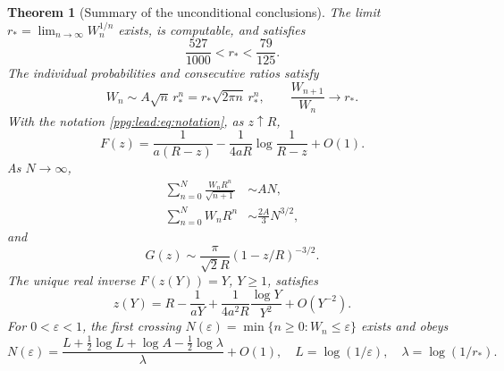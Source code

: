 \documentclass[11pt,letterpaper]{article}
\newtheorem{theorem}{Theorem}[section]
\theoremstyle{remark}\newtheorem{remark}[theorem]{Remark}
\numberwithin{equation}{section}
\begin{document}
\begin{theorem}[Summary of the unconditional conclusions]\label{ppg:lead:thm:summary}
The limit $r_* = \lim_{n\to\infty}W_n^{1/n}$ exists, is computable, and satisfies
\begin{equation}\label{ppg:lead:eq:numeric}
 \frac{527}{1000}<r_*<\frac{79}{125}.
\end{equation}
The individual probabilities and consecutive ratios satisfy
\begin{equation}\label{ppg:lead:eq:summarypointwise}
 W_n\sim A\sqrt n\,r_*^n=r_*\sqrt{2\pi n}\,r_*^n,
 \qquad\frac{W_{n+1}}{W_n}\longrightarrow r_*.
\end{equation}
With the notation \eqref{ppg:lead:eq:notation}, as $z\uparrow R$,
\begin{equation}\label{ppg:lead:eq:summaryF}
 F(z)=\frac1{a(R-z)}-\frac1{4aR}\log\frac1{R-z}+O(1).
\end{equation}
As $N\to\infty$,
\begin{align}
 \sum_{n=0}^N\frac{W_nR^n}{\sqrt{n+1}}&\sim AN,\label{ppg:lead:eq:summaryV}\\
 \sum_{n=0}^N W_nR^n&\sim\frac{2A}{3}N^{3/2},\label{ppg:lead:eq:summaryB}
\end{align}
and
\begin{equation}\label{ppg:lead:eq:summaryG}
 G(z)\sim\frac{\pi}{\sqrt2 R}(1-z/R)^{-3/2}.
\end{equation}
The unique real inverse $F(z(Y))=Y$, $Y\ge1$, satisfies
\begin{equation}\label{ppg:lead:eq:summaryinverse}
 z(Y)=R-\frac1{aY}+\frac1{4a^2R}\frac{\log Y}{Y^2}+O(Y^{-2}).
\end{equation}
For $0<\varepsilon<1$, the first crossing
$N(\varepsilon)=\min\{n\ge0:W_n\le\varepsilon\}$ exists and obeys
\begin{equation}\label{ppg:lead:eq:summarythreshold}
 N(\varepsilon)=\frac{L+\tfrac12\log L+\log A-\tfrac12\log\lambda}{\lambda}+O(1),
 \quad L=\log(1/\varepsilon),\quad\lambda=\log(1/r_*).
\end{equation}
\end{theorem}
\end{document}
